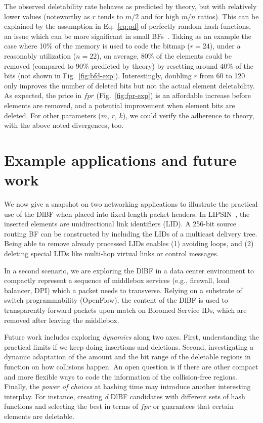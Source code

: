 \documentclass[conference]{IEEEtran}
\begin{document}
The observed deletability rate behaves as predicted by theory, but with relatively lower values (noteworthy as $r$ tends to $m/2$ and for high $m/n$ ratios). This can be explained by the assumption in Eq.~\ref{eq:pd} of perfectly random hash functions, an issue which can be more significant in small BFs~\cite{bose2008false}. 
Taking as an example the case where 10\% of the memory is used to code the bitmap ($r=24$), under a reasonably utilization ($n=22$), on average, 80\% of the elements could be removed (compared to 90\% predicted by theory)  by resetting around 40\% of the bits (not shown in Fig.~\ref{fig:bfd-exp}). Interestingly, doubling $r$ from 60 to 120 only improves the number of deleted bits but not the actual element deletability. 
As expected, the price in $fpr$  (Fig.~\ref{fig:fpr-exp}) is an affordable increase before elements are removed, and a potential improvement when element bits are deleted. For other parameters ($m$, $r$, $k$), we could verify the adherence to theory, with the above noted divergences, too. 








\section{Example applications and future work}
\label{sec:applications}

We now give a snapshot on two networking applications to illustrate the practical use of the DlBF when placed
into fixed-length packet headers. 
In LIPSIN~\cite{lipsin}, the inserted elements are unidirectional link identifiers (LID). A 256-bit source routing BF can be constructed by including the LIDs of a multicast delivery tree. Being able to remove already processed LIDs enables (1) avoiding loops, and (2) deleting special LIDs like multi-hop virtual links or control messages. 

In a second scenario, we are exploring the DlBF in a data center environment to compactly represent a sequence of middlebox services (e.g., firewall, load balancer, DPI) which a packet needs to transverse. Relying on a substrate of switch programmability (OpenFlow), the content of the DlBF is used to transparently forward packets upon match on Bloomed Service IDs, which are removed after leaving the middlebox. 

Future work includes exploring \textit{dynamics} along two axes. First, understanding the practical limits if we keep doing insertions and deletions. Second,
investigating a dynamic adaptation of the amount and the bit range of the deletable regions in function on how collisions happen. 
An open question is if there are other compact and more flexible ways to code the information of the collision-free regions.
Finally, the \textit{power of choices} at hashing time may introduce another interesting interplay. For instance, creating \textit{d} DlBF candidates with different sets of hash functions and selecting the best  in terms of $fpr$ or guarantees that certain elements are deletable. 
\end{document}
